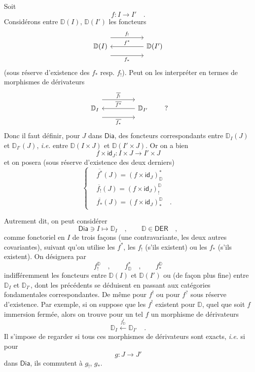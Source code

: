 \documentclass[11pt]{article}
\newcommand{\printedpage}[1]{\marginpar{\footnotesize p.~#1}}
\newcommand{\msp}[1]{\marginpar{\footnotesize [#1]}}
\newcommand{\Dia}{\mathsf{Dia}}
\newcommand{\id}{\mathsf{id}}
\newcommand{\D}{\mathbb{D}}
\newcommand{\DER}{\mathsf{DER}}
\begin{document}
\printedpage{15}

\msp{page 20}

Soit
\[
f : I \longrightarrow I' \quad .
\]
Considérons entre $\D(I)$, $\D(I')$ les foncteurs
\[
\begin{tikzcd}[column sep=huge]
\D(I) \arrow[r, shift left=3ex, "f_!"] \arrow[r, shift right=3ex, "f_*"'] & \D(I') \arrow[l, "f^*"']
\end{tikzcd}
\]
(sous réserve d'existence des $f_*$ resp. $f_!$). Peut on les interpréter en termes de morphismes de dérivateurs
\[
\begin{tikzcd}[column sep=huge]
\D_I \arrow[r, shift left=3ex, "\overline{f_!}"] \arrow[r, shift right=3ex, "\overline{f_*}"'] & \D_{I'} \arrow[l, "\overline{f^*}"']
\end{tikzcd}
\qquad ?
\]
Donc il faut définir, pour $J$ dans $\Dia$, des foncteurs correspondants entre $\D_I(J)$ et $\D_{I'}(J)$, \textit{i.e.} entre $\D(I \times J)$ et $\D(I' \times J)$. Or on a bien
\[
f \times \id_J : I \times J \longrightarrow I' \times J
\]
et on posera (sous réserve d'existence des deux derniers)
\[
\left\{
\begin{aligned}
&\overline{f^*}(J) = (f \times \id_J)^*_{\D} \\[1ex]
&\overline{f_!}(J) = (f \times \id_J)^{\D}_! \\[1ex]
&\overline{f_*}(J) = (f \times \id_J)^{\D}_* \quad .
\end{aligned}
\right.
\]

\msp{page 21}

Autrement dit, on peut considérer
\[
\Dia \ni I \longmapsto \D_I \quad , \qquad \D \in \DER \quad ,
\]
comme fonctoriel en $I$ de trois façons (une contravariante, les deux autres covariantes), suivant qu'on utilise les $f^*$, les $f_!$ (s'ils existent) ou les $f_*$ (s'ils existent). On désignera par
\[
f^{\D}_! \quad , \qquad f^*_{\D} \quad , \qquad f^{\D}_*
\]
indifféremment les foncteurs entre $\D(I)$ et $\D(I')$ ou (de façon plus fine) entre $\D_I$ et $\D_{I'}$, dont les précédents se déduisent en passant aux catégories fondamentales correspondantes. De même pour $f^!$ ou pour $f^?$ sous réserve d'existence. Par exemple, si on suppose que les $f^!$ existent pour $\D$, quel que soit $f$ immersion fermée, alors on trouve pour un tel $f$ un morphisme de dérivateurs
\[
\D_I \xleftarrow{f^!_{\D}} \D_{I'} \quad .
\]
Il s'impose de regarder si tous ces morphismes de dérivateurs sont exacts, \textit{i.e.} si pour
\[
g : J \longrightarrow J'
\]
dans $\Dia$, ils commutent à $g_!$, $g_*$.
\end{document}

